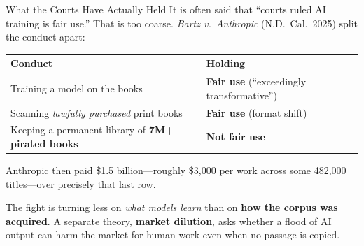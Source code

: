 ﻿\documentclass[aspectratio=169,11pt]{beamer}
\begin{document}
\begin{frame}{What the Courts Have Actually Held}
It is often said that ``courts ruled AI training is fair use.'' That is too coarse. \textit{Bartz v.\ Anthropic} (N.D.\ Cal.\ 2025) split the conduct apart:

\vspace{0.2em}
\begin{table}[h]
\centering
\small
\begin{tabular}{@{}p{6.6cm}l@{}}
\toprule
\textbf{Conduct} & \textbf{Holding} \\
\midrule
Training a model on the books & \textbf{Fair use} (``exceedingly transformative'') \\
Scanning \emph{lawfully purchased} print books & \textbf{Fair use} (format shift) \\
Keeping a permanent library of \textbf{7M+ pirated books} & \textbf{Not fair use} \\
\bottomrule
\end{tabular}
\end{table}

\vspace{0.2em}
Anthropic then paid \$1.5 billion---roughly \$3,000 per work across some 482,000 titles---over precisely that last row.

\begin{conceptbox}
\scriptsize
The fight is turning less on \emph{what models learn} than on \textbf{how the corpus was acquired}. A separate theory, \textbf{market dilution}, asks whether a flood of AI output can harm the market for human work even when no passage is copied.
\end{conceptbox}
\end{frame}
\end{document}
